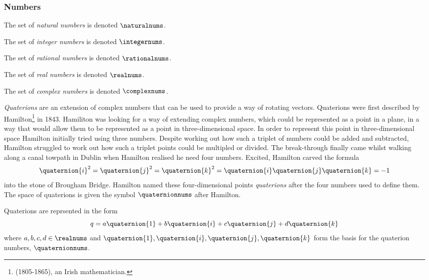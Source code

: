 \subsubsection{Numbers}
\label{subsubsec:MathsSpaceSetsNumbers}


The set of \emph{natural numbers} is denoted $\naturalnums$.


The set of \emph{integer numbers} is denoted $\integernums$.


The set of \emph{rational numbers} is denoted $\rationalnums$.


The set of \emph{real numbers} is denoted $\realnums$.


The set of \emph{complex numbers} is denoted $\complexnums$.


\emph{Quaterions} are an extension of complex
numbers that can be used to provide a way of rotating
vectors. Quaterions were first described by
Hamilton\footnote{ (1805-1865), an Irish mathematician.} in
1843. Hamiliton was looking for a way of extending complex numbers,
which could be represented as a point in a plane, in a way that would
allow them to be represented as a point in three-dimensional space. In
order to represent this point in three-dimensional space Hamilton
initially tried using three numbers. Despite working out how such a
triplet of numbers could be added and subtracted, Hamilton struggled
to work out how such a triplet points could be multipled or
divided. The break-through finally came whilst walking along a canal
towpath in Dublin when Hamilton realised he need four numbers. Excited, Hamilton carved the formula
\begin{equation}
  \quaternion{i}^{2}=\quaternion{j}^{2}=\quaternion{k}^{2}=\quaternion{i}\quaternion{j}\quaternion{k}=-1
\end{equation}
into the stone of Brougham Bridge. Hamilton named these
four-dimensional points \emph{quaterions} after the four numbers used
to define them. The space of quaterions is given the symbol
$\quaternionnums$ after Hamilton.

Quaterions are reprsented in the form
\begin{equation}
  q = a\quaternion{1} + b\quaternion{i} + c\quaternion{j} + d\quaternion{k}
\end{equation}
where $a,b,c,d\in\realnums$ and
$\quaternion{1},\quaternion{i},\quaternion{j},\quaternion{k}$ form the basis for
the quaterion numbers, $\quaternionnums$.


